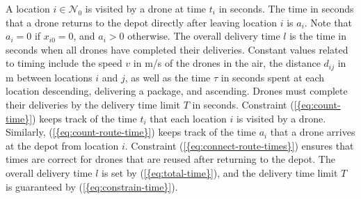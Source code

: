 \documentclass[journal]{IEEEtran}
\begin{document}
A location $i \in {\ensuremath{{\ensuremath{\mathcal{N}}}_{0}}}$ is visited by a drone at time ${\ensuremath{t_{{i}}}}$ in seconds. The time in seconds that a drone returns to the depot directly after leaving location $i$ is ${\ensuremath{a_{{i}}}}$. Note that ${\ensuremath{a_{{i}}}}=0$ if ${\ensuremath{x_{{i} {0}}}}=0$, and ${\ensuremath{a_{{i}}}}>0$ otherwise. The overall delivery time ${\ensuremath{l}}$ is the time in seconds when all drones have completed their deliveries. Constant values related to timing include the speed ${\ensuremath{v}}$ in m/s of the drones in the air, the distance ${\ensuremath{d_{{i} {j}}}}$ in m between locations $i$ and $j$, as well as the time ${\ensuremath{\tau}}$ in seconds spent at each location descending, delivering a package, and ascending. Drones must complete their deliveries by the delivery time limit ${\ensuremath{T}}$ in seconds. Constraint {(\ref{{eq:count-time}})} keeps track of the time ${\ensuremath{t_{{i}}}}$ that each location $i$ is visited by a drone. Similarly, {(\ref{{eq:count-route-time}})} keeps track of the time ${\ensuremath{a_{{i}}}}$ that a drone arrives at the depot from location $i$. Constraint {(\ref{{eq:connect-route-times}})} ensures that times are correct for drones that are reused after returning to the depot. The overall delivery time ${\ensuremath{l}}$ is set by {(\ref{{eq:total-time}})}, and the delivery time limit ${\ensuremath{T}}$ is guaranteed by {(\ref{{eq:constrain-time}})}.
\end{document}
